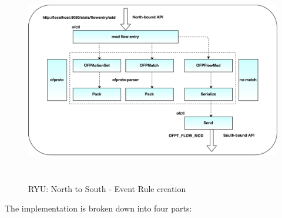 \begin{figure}[H]
 \centering
 \caption{RYU: North to South - Event Rule creation}
 \includegraphics[height=9cm,width=12cm]{ryu01.pdf}
\end{figure}
The implementation is broken down into four parts:
